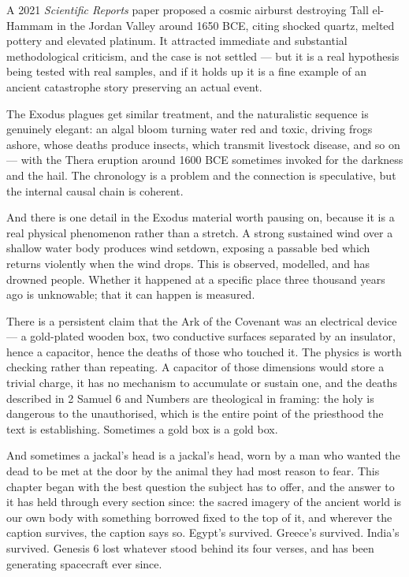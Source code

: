 A 2021 \emph{Scientific Reports} paper proposed a cosmic airburst destroying Tall el-Hammam in
the Jordan Valley around 1650 BCE, citing shocked quartz, melted pottery and elevated platinum.
It attracted immediate and substantial methodological criticism, and the case is not settled ---
but it is a real hypothesis being tested with real samples, and if it holds up it is a fine
example of an ancient catastrophe story preserving an actual event.

The Exodus plagues get similar treatment, and the naturalistic sequence is genuinely elegant:
an algal bloom turning water red and toxic, driving frogs ashore, whose deaths produce insects,
which transmit livestock disease, and so on --- with the Thera eruption around 1600 BCE sometimes
invoked for the darkness and the hail. The chronology is a problem and the connection is
speculative, but the internal causal chain is coherent.

And there is one detail in the Exodus material worth pausing on, because it is a real physical
phenomenon rather than a stretch. A strong sustained wind over a shallow water body produces
wind setdown, exposing a passable bed which returns violently when the wind drops. This is
observed, modelled, and has drowned people. Whether it happened at a specific place three
thousand years ago is unknowable; that it can happen is measured.

\begin{funfact}
There is a persistent claim that the Ark of the Covenant was an electrical device --- a
gold-plated wooden box, two conductive surfaces separated by an insulator, hence a capacitor,
hence the deaths of those who touched it. The physics is worth checking rather than repeating.
A capacitor of those dimensions would store a trivial charge, it has no mechanism to accumulate
or sustain one, and the deaths described in 2 Samuel 6 and Numbers are theological in framing:
the holy is dangerous to the unauthorised, which is the entire point of the priesthood the text
is establishing. Sometimes a gold box is a gold box.
\end{funfact}

And sometimes a jackal's head is a jackal's head, worn by a man who wanted the dead to be met at
the door by the animal they had most reason to fear. This chapter began with the best question the
subject has to offer, and the answer to it has held through every section since: the sacred
imagery of the ancient world is our own body with something borrowed fixed to the top of it, and
wherever the caption survives, the caption says so. Egypt's survived. Greece's survived. India's
survived. Genesis 6 lost whatever stood behind its four verses, and has been generating
spacecraft ever since.


